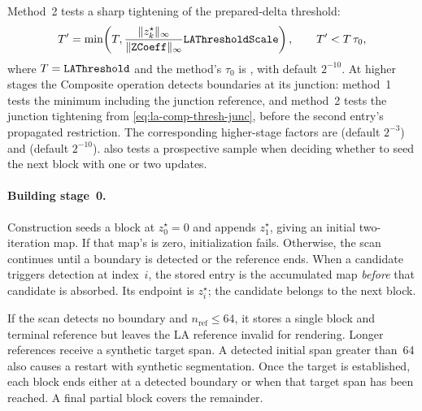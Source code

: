 Method~2 tests a sharp tightening of the prepared-delta threshold:
\begin{equation}
T'=\min\!\left(T,
  \frac{\lVert z_k^\star\rVert_\infty}
       {\lVert\texttt{ZCoeff}\rVert_\infty}
  \texttt{LAThresholdScale}\right),\qquad
T'<T\,\tau_0,
\label{eq:period-detect-coeff}
\end{equation}
where $T=\texttt{LAThreshold}$ and the method's $\tau_0$ is
, with default $2^{-10}$.
At higher stages the Composite operation detects boundaries at its
junction: method~1 tests the minimum including the junction reference,
and method~2 tests the junction tightening from
\cref{eq:la-comp-thresh-junc}, before the second entry's propagated
restriction. The corresponding higher-stage factors are
 (default $2^{-3}$) and
 (default $2^{-10}$).
 also tests a prospective sample when deciding
whether to seed the next block with one or two updates.

\paragraph{Building stage~0.}
Construction seeds a block at $z_0^\star=0$ and appends $z_1^\star$,
giving an initial two-iteration map. If that map's  is
zero, initialization fails. Otherwise, the scan continues until a
boundary is detected or the reference ends. When a candidate triggers
detection at index~$i$, the stored entry is the accumulated map
\emph{before} that candidate is absorbed. Its endpoint is $z_i^\star$;
the candidate belongs to the next block.

If the scan detects no boundary and $n_{\mathrm{ref}}\le64$, it stores
a single block and terminal reference but leaves the LA reference
invalid for rendering. Longer references receive a synthetic target
span. A detected initial span greater than~64 also causes a restart
with synthetic segmentation. Once the target is established, each
block ends either at a detected boundary or when that target span has
been reached. A final partial block covers the remainder.

